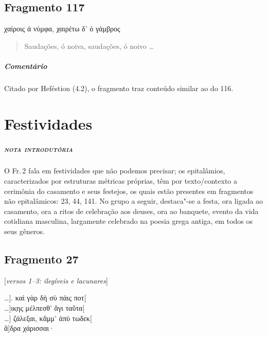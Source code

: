 {\section{Fragmento 117}

\begin{gkverse}
\dagger{}χαίροις ἀ νύμφα\dagger{}, χαιρέτω δ’ ὀ γάμβρος
\end{gkverse}

\begin{verse}
Saudações, ó noiva, saudações, ó noivo \ldots{}
\end{verse}

\medskip

{\paragraph{Comentário} Citado por Heféstion (4.2), o fragmento traz conteúdo similar ao do 116.}


\chapter{Festividades}

\paragraph{\textsc{nota introdutória}}
O Fr.\,2 fala em festividades que não podemos precisar; os epitalâmios,
caracterizados por estruturas métricas próprias, têm por texto/contexto a
cerimônia do casamento e seus festejos, os quais estão presentes em fragmentos não epitalâmicos: 23, 44, 141. No grupo a seguir, destaca"-se a festa,
ora ligada ao casamento, ora a ritos de celebração aos deuses, ora ao banquete,
evento da vida cotidiana masculina, largamente celebrado na poesia grega
antiga, em todos os seus gêneros.

\section{Fragmento 27}

\begin{gkverse}
\textnormal{[\textit{versos 1--3: ilegíveis e lacunares}]}

\ldots{}]. καὶ γὰρ δὴ σὺ πάις ποτ[\\
\ldots{}]ικ̣ης μέλπεσθ’ ἄγι ταῦτα[\\
\ldots{}] ζάλεξαι, κἄμμ’ ἀπὺ τωδεκ[\\
ἄ]δρα χάρισσαι·


\end{gkverse}}
